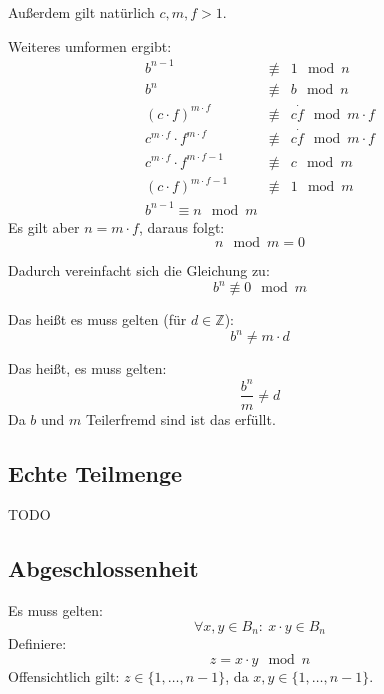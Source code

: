 \documentclass[DIN, pagenumber=false, fontsize=11pt, parskip=half]{scrartcl}
\begin{document}
    Außerdem gilt natürlich $c, m, f > 1$.

    Weiteres umformen ergibt:
    \begin{eqnarray}
        b^{n-1} &\not\equiv& 1 \mod n \\
        b^{n} &\not\equiv& b \mod n \\
        {\left(c \cdot f \right)}^{m \cdot f} &\not\equiv& c \dot f \mod m \cdot f \\
        c^{m \cdot f} \cdot f^{m \cdot f} &\not\equiv& c \dot f \mod m \cdot f \\
        c^{m \cdot f} \cdot f^{m \cdot f - 1} &\not\equiv& c \mod m \\
        {\left(c \cdot f\right)}^{m \cdot f -1} &\not\equiv& 1 \mod m \\
        b^{n-1} \equiv n \mod m
    \end{eqnarray}
    Es gilt aber $n = m \cdot f$, daraus folgt:
    \begin{equation}
        n \mod m = 0
    \end{equation}

    Dadurch vereinfacht sich die Gleichung zu:
    \begin{equation}
        b^n \not\equiv 0 \mod m
    \end{equation}

    Das heißt es muss gelten (für $d \in \mathbb{Z}$):
    \begin{equation}
        b^n \neq m \cdot d
    \end{equation}

    Das heißt, es muss gelten:
    \begin{equation}
        \frac{b^n}{m} \neq d
    \end{equation}
    Da $b$ und $m$ Teilerfremd sind ist das erfüllt. 

    \subsection{Echte Teilmenge}
    TODO

    \subsection{Abgeschlossenheit}
    Es muss gelten:
    \begin{equation}
        \forall x, y \in B_n:\ x \cdot y \in B_n
    \end{equation}
    Definiere:
    \begin{equation}
        z = x \cdot y \mod n
    \end{equation}
    Offensichtlich gilt: $z \in \{1, \ldots, n-1\}$, da $x, y \in \{1, \ldots, n-1\}$.
\end{document}
